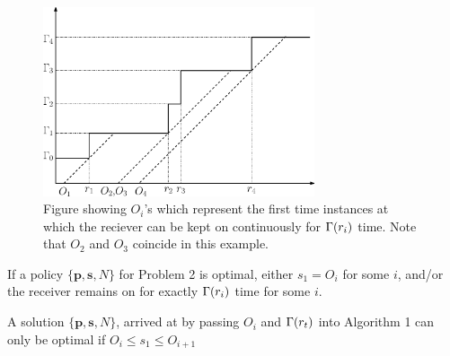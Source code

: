 \begin{figure}
\centering
  \centerline{\includegraphics[width=8cm]{origin_points.eps}}
\caption{Figure showing $O_i$'s which represent the first time instances at which the reciever can be kept on continuously for $\Gamma(r_i)$ time. Note that $O_2$ and $O_3$ coincide in this example.}\label{figure_origin_points}
\end{figure}

\begin{lemma}
If a policy $\{\bm{p},\bm{s},N\}$ for Problem 2 is optimal, either $s_1 = O_i$ for some $i$, and/or the receiver remains on for exactly $\Gamma(r_i)$ time for some $i$.
\label{lemma_startpoints}
\end{lemma}

\begin{lemma}
A solution $\{\bm{p},\bm{s},N\}$, arrived at by passing $O_i$ and $\Gamma(r_t)$ into Algorithm 1 can only be optimal if $O_i \leq s_1 \leq O_{i+1}$ 
\label{lemma_startpoints}
\end{lemma}

